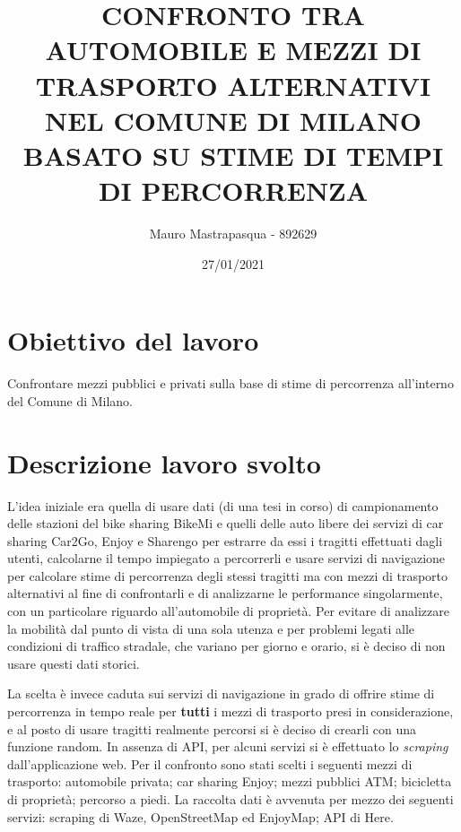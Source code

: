\documentclass[a4paper,12pt]{article}
\title{{\Large\textbf{CONFRONTO TRA AUTOMOBILE E \linebreak MEZZI DI TRASPORTO ALTERNATIVI \linebreak NEL COMUNE DI MILANO BASATO SU \linebreak STIME DI TEMPI DI PERCORRENZA}}}
\author{\LARGE{Mauro Mastrapasqua - 892629}}
\date{\Large{27/01/2021}}
\begin{document}
	\maketitle
	\vspace{1cm}
	
\section{Obiettivo del lavoro}
Confrontare mezzi pubblici e privati sulla base di stime di percorrenza all'interno del Comune di Milano.

\section{Descrizione lavoro svolto}
L'idea iniziale era quella di usare dati (di una tesi in corso) di campionamento delle stazioni del bike sharing BikeMi e quelli delle auto libere dei servizi di car sharing Car2Go, Enjoy e Sharengo per estrarre da essi i tragitti effettuati dagli utenti, calcolarne il tempo impiegato a percorrerli e usare servizi di navigazione per calcolare stime di percorrenza degli stessi tragitti ma con mezzi di trasporto alternativi al fine di confrontarli e di analizzarne le performance singolarmente, con un particolare riguardo all'automobile di proprietà.
Per evitare di analizzare la mobilità dal punto di vista di una sola utenza e per problemi legati alle condizioni di traffico stradale, che variano per giorno e orario, si è deciso di non usare questi dati storici.

La scelta è invece caduta sui servizi di navigazione in grado di offrire stime di percorrenza in tempo reale per \textbf{tutti} i mezzi di trasporto presi in considerazione, e al posto di usare tragitti realmente percorsi si è deciso di crearli con una funzione random. In assenza di API, per alcuni servizi si è effettuato lo \textit{scraping} dall'applicazione web. Per il confronto sono stati scelti i seguenti mezzi di trasporto: automobile privata; car sharing Enjoy; mezzi pubblici ATM; bicicletta di proprietà; percorso a piedi. La raccolta dati è avvenuta per mezzo dei seguenti servizi: scraping di Waze, OpenStreetMap ed EnjoyMap; API di Here.
\end{document}
